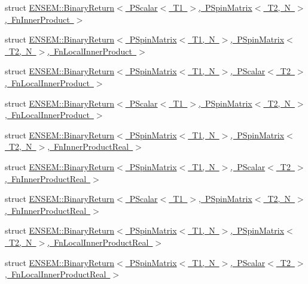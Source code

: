 \begin{DoxyCompactItemize}
\item 
struct \mbox{\hyperlink{structENSEM_1_1BinaryReturn_3_01PScalar_3_01T1_01_4_00_01PSpinMatrix_3_01T2_00_01N_01_4_00_01FnInnerProduct_01_4}{E\+N\+S\+E\+M\+::\+Binary\+Return$<$ P\+Scalar$<$ T1 $>$, P\+Spin\+Matrix$<$ T2, N $>$, Fn\+Inner\+Product $>$}}
\item 
struct \mbox{\hyperlink{structENSEM_1_1BinaryReturn_3_01PSpinMatrix_3_01T1_00_01N_01_4_00_01PSpinMatrix_3_01T2_00_01N_01c4db3884b32cba02d837337f3b77f0f0}{E\+N\+S\+E\+M\+::\+Binary\+Return$<$ P\+Spin\+Matrix$<$ T1, N $>$, P\+Spin\+Matrix$<$ T2, N $>$, Fn\+Local\+Inner\+Product $>$}}
\item 
struct \mbox{\hyperlink{structENSEM_1_1BinaryReturn_3_01PSpinMatrix_3_01T1_00_01N_01_4_00_01PScalar_3_01T2_01_4_00_01FnLocalInnerProduct_01_4}{E\+N\+S\+E\+M\+::\+Binary\+Return$<$ P\+Spin\+Matrix$<$ T1, N $>$, P\+Scalar$<$ T2 $>$, Fn\+Local\+Inner\+Product $>$}}
\item 
struct \mbox{\hyperlink{structENSEM_1_1BinaryReturn_3_01PScalar_3_01T1_01_4_00_01PSpinMatrix_3_01T2_00_01N_01_4_00_01FnLocalInnerProduct_01_4}{E\+N\+S\+E\+M\+::\+Binary\+Return$<$ P\+Scalar$<$ T1 $>$, P\+Spin\+Matrix$<$ T2, N $>$, Fn\+Local\+Inner\+Product $>$}}
\item 
struct \mbox{\hyperlink{structENSEM_1_1BinaryReturn_3_01PSpinMatrix_3_01T1_00_01N_01_4_00_01PSpinMatrix_3_01T2_00_01N_01_4_00_01FnInnerProductReal_01_4}{E\+N\+S\+E\+M\+::\+Binary\+Return$<$ P\+Spin\+Matrix$<$ T1, N $>$, P\+Spin\+Matrix$<$ T2, N $>$, Fn\+Inner\+Product\+Real $>$}}
\item 
struct \mbox{\hyperlink{structENSEM_1_1BinaryReturn_3_01PSpinMatrix_3_01T1_00_01N_01_4_00_01PScalar_3_01T2_01_4_00_01FnInnerProductReal_01_4}{E\+N\+S\+E\+M\+::\+Binary\+Return$<$ P\+Spin\+Matrix$<$ T1, N $>$, P\+Scalar$<$ T2 $>$, Fn\+Inner\+Product\+Real $>$}}
\item 
struct \mbox{\hyperlink{structENSEM_1_1BinaryReturn_3_01PScalar_3_01T1_01_4_00_01PSpinMatrix_3_01T2_00_01N_01_4_00_01FnInnerProductReal_01_4}{E\+N\+S\+E\+M\+::\+Binary\+Return$<$ P\+Scalar$<$ T1 $>$, P\+Spin\+Matrix$<$ T2, N $>$, Fn\+Inner\+Product\+Real $>$}}
\item 
struct \mbox{\hyperlink{structENSEM_1_1BinaryReturn_3_01PSpinMatrix_3_01T1_00_01N_01_4_00_01PSpinMatrix_3_01T2_00_01N_01eaeba25a25a0a8754a5e4bd724d7056c}{E\+N\+S\+E\+M\+::\+Binary\+Return$<$ P\+Spin\+Matrix$<$ T1, N $>$, P\+Spin\+Matrix$<$ T2, N $>$, Fn\+Local\+Inner\+Product\+Real $>$}}
\item 
struct \mbox{\hyperlink{structENSEM_1_1BinaryReturn_3_01PSpinMatrix_3_01T1_00_01N_01_4_00_01PScalar_3_01T2_01_4_00_01FnLocalInnerProductReal_01_4}{E\+N\+S\+E\+M\+::\+Binary\+Return$<$ P\+Spin\+Matrix$<$ T1, N $>$, P\+Scalar$<$ T2 $>$, Fn\+Local\+Inner\+Product\+Real $>$}}

\end{DoxyCompactItemize}
